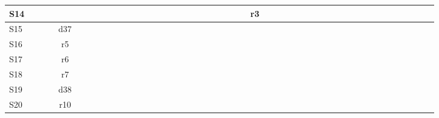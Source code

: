 \documentclass[a4paper, 12pt]{article}
\begin{document}
\begin{table}[htbp]
\begin{turn}{90}
{\begin{tabular}{|l|c|c|c|c|c|c|c|c|c|c|c|c|c|c|c|c|c|c|c|c|c|c|c|c|c||c|c|c|c|c|c|c|c|c|c|c|c|c|c|c|c|c|c|c|c|}
    \midrule
    S14   &       &       &       &       &       &       &       &       &       &       &       &       &       &       &       &       &       &       &       &       &       &       &       &       & r3    &       &       &       &       &       &       &       &       &       &       &       &       &       &       &       &       &       &       &       &  \\
    \midrule
    S15   &       &       &       & d37   &       &       &       &       &       &       &       &       &       &       &       &       &       &       &       &       &       &       &       &       &       &       &       &       &       &       &       &       &       &       &       &       &       &       &       &       &       &       &       &       &  \\
    \midrule
    S16   &       &       &       & r5    &       &       &       &       &       &       &       &       &       &       &       &       &       &       &       &       &       &       &       &       &       &       &       &       &       &       &       &       &       &       &       &       &       &       &       &       &       &       &       &       &  \\
    \midrule
    S17   &       &       &       & r6    &       &       &       &       &       &       &       &       &       &       &       &       &       &       &       &       &       &       &       &       &       &       &       &       &       &       &       &       &       &       &       &       &       &       &       &       &       &       &       &       &  \\
    \midrule
    S18   &       &       &       & r7    &       &       &       &       &       &       &       &       &       &       &       &       &       &       &       &       &       &       &       &       &       &       &       &       &       &       &       &       &       &       &       &       &       &       &       &       &       &       &       &       &  \\
    \midrule
    S19   &       &       &       & d38   &       &       &       &       &       &       &       &       &       &       &       &       &       &       &       &       &       &       &       &       &       &       &       &       &       &       &       &       &       &       &       &       &       &       &       &       &       &       &       &       &  \\
    \midrule
    S20   &       &       &       & r10   &       &       &       &       &       &       &       &       &       &       &       &       &       &       &       &       &       &       &       &       &       &       &       &       &       &       &       &       &       &       &       &       &       &       &       &       &       &       &       &       &  \\

\end{tabular}}
\end{turn}
\end{table}
\end{document}
